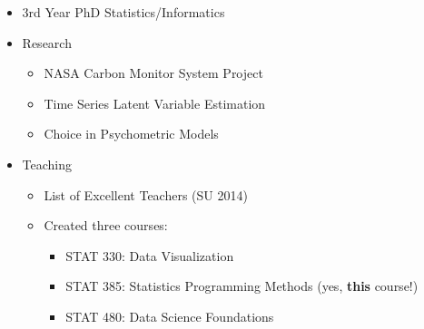 \documentclass{beamer}\usepackage[]{graphicx}\usepackage[]{color}
\begin{document}
\begin{frame}
\begin{columns}
\begin{column}{.39\linewidth}
    \end{column}
    \begin{column}{.6\linewidth}
      \begin{itemize}
        \item 3rd Year PhD Statistics/Informatics
        \item Research
        \begin{itemize}
          \item NASA Carbon Monitor System Project
          \item Time Series Latent Variable Estimation
          \item Choice in Psychometric Models 
        \end{itemize}
        
        \item Teaching
        \begin{itemize}
          \item List of Excellent Teachers (SU 2014)
          \item Created three courses:
          \begin{itemize}
            \item STAT 330: Data Visualization
            \item STAT 385: Statistics Programming Methods (yes, \textbf{this} course!)
            \item STAT 480: Data Science Foundations
          \end{itemize}
        \end{itemize}
      \end{itemize}
    \end{column}
  \end{columns}
\end{frame}
\end{document}
